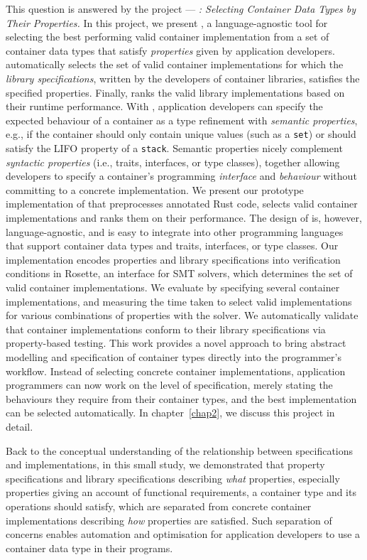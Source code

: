 This question is answered by the project --- \emph{\Primrose{}: Selecting Container Data Types by Their Properties.}
In this project, we present \Primrose{}, a language-agnostic tool for selecting the best performing valid container implementation from a set of container data types that satisfy \emph{properties} given by application developers.
\Primrose{} automatically selects the set of valid container implementations for which the \emph{library specifications}, written by the developers of container libraries, satisfies the specified properties.
Finally, \Primrose{} ranks the valid library implementations based on their runtime performance.
With \Primrose{}, application developers can specify the expected behaviour of a container as a type refinement with \emph{semantic properties}, e.g., if the container should only contain unique values (such as a \lstinline{set}) or should satisfy the LIFO property of a \lstinline{stack}.
Semantic properties nicely complement \emph{syntactic properties} (i.e., traits, interfaces, or type classes), together allowing developers to specify a container's programming \emph{interface} and \emph{behaviour} without committing to a concrete implementation.
We present our prototype implementation of \Primrose{} that preprocesses annotated Rust code, selects valid container implementations and ranks them on their performance. The design of \Primrose{} is, however, language-agnostic, and is easy to integrate into other programming languages that support container data types and traits, interfaces, or type classes. Our implementation encodes properties and library specifications into verification conditions in Rosette, an interface for SMT solvers, which determines the set of valid container implementations. We evaluate \Primrose{} by specifying several container implementations, and measuring the time taken to select valid implementations for various combinations of properties with the solver. We automatically validate that container implementations conform to their library specifications via property-based testing.
This work provides a novel approach to bring abstract modelling and specification of container types directly into the programmer's workflow.
Instead of selecting concrete container implementations, application programmers can now work on the level of specification, merely stating the behaviours they require from their container types, and the best implementation can be selected automatically. In chapter~\ref{chap2}, we discuss this project in detail.

Back to the conceptual understanding of the relationship between specifications and implementations, in this small study, we demonstrated that property specifications and library specifications describing \emph{what} properties, especially properties giving an account of functional requirements, a container type and its operations should satisfy, which are separated from concrete container implementations describing \emph{how} properties are satisfied. Such separation of concerns enables automation and optimisation for application developers to use a container data type in their programs.

